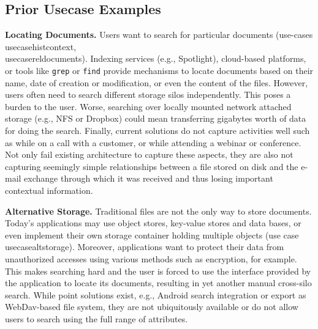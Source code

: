 \subsection{Prior Usecase Examples}


\noindent\textbf{Locating Documents.}
Users want to search for particular documents (use-cases \\usecasehistcontext, \\usecasereldocuments).
Indexing services (e.g., Spotlight), cloud-based platforms, or tools like \texttt{grep} or \texttt{find} provide mechanisms to locate documents based on their name, date of creation or modification, or even the content of the files.
However, users often need to search different storage silos independently. This poses a burden to the user.
Worse, searching over locally mounted network attached storage (e.g., NFS or Dropbox) could mean transferring gigabytes worth of data for doing the search.
Finally, current solutions do not capture activities well such as while on a call with a customer, or while attending a webinar or conference.
Not only fail existing architecture to capture these aspects, they are also not capturing seemingly simple relationships between a file stored on disk and the e-mail exchange through which it was received and thus losing important contextual information.

\noindent\textbf{Alternative Storage.}
Traditional files are not the only way to store documents.
Today's applications may use object stores, key-value stores and data bases, or even implement their own storage container holding multiple objects (use case \\usecasealtstorage).
Moreover, applications want to protect their data from unauthorized accesses using various methods such as encryption, for example.
This makes searching hard and the user is forced to use the interface provided by the application to locate its documents, resulting in yet another manual cross-silo search.
While point solutions exist, e.g., Android search integration or export as WebDav-based file system, they are not ubiquitously available or do not allow users to search using the full range of attributes.

